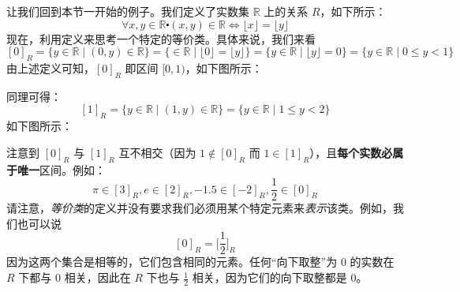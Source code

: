 \begin{example}
    让我们回到本节一开始的例子。我们定义了实数集 $\mathbb{R}$ 上的关系 $R$，如下所示：
    \[\forall x, y \in \mathbb{R} \centerdot (x, y) \in \mathbb{R} \iff \lfloor x \rfloor = \lfloor y \rfloor\]
    现在，利用定义来思考一个特定的等价类。具体来说，我们来看
    \[[0]_R = \{y \in \mathbb{R} \mid (0, y) \in \mathbb{R}\} = \{\in \mathbb{R} \mid \lfloor 0 \rfloor = \lfloor y \rfloor\} = \{y \in \mathbb{R} \mid \lfloor y \rfloor = 0\} = \{y \in \mathbb{R} \mid 0 \le y < 1\}\]
    由上述定义可知，$[0]_R$ 即区间 $[0, 1)$，如下图所示：

    \begin{center}
        {}
    \end{center}
    同理可得：
    \[[1]_R = \{y \in \mathbb{R} \mid (1, y) \in \mathbb{R}\} = \{y \in \mathbb{R} \mid 1 \le y < 2\}\]
    如下图所示：

    \begin{center}
        {}
    \end{center}
\end{example}

注意到 $[0]_R$ 与 $[1]_R$ 互不相交（因为 $1 \notin [0]_R$ 而 $1 \in [1]_R$），且\textbf{每个实数必属于唯一}区间。例如：
\[\pi \in [3]_R, e \in [2]_R, -1.5 \in [-2]_R,\frac{1}{2} \in [0]_R\]
请注意，\emph{等价类}的定义并没有要求我们必须用某个特定元素来\emph{表示}该类。例如，我们也可以说
\[[0]_R = \Big[\frac{1}{2}\Big]_R\]
因为这两个集合是相等的，它们包含相同的元素。任何``向下取整''为 $0$ 的实数在 $R$ 下都与 $0$ 相关，因此在 $R$ 下也与 $\frac{1}{2}$ 相关，因为它们的向下取整都是 $0$。

